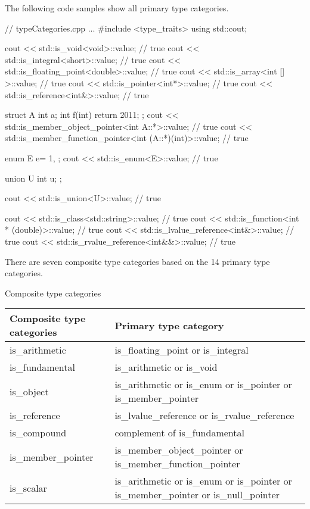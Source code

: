 The following code samples show all primary type categories.


\begin{cpp}
// typeCategories.cpp
...
#include <type_traits>
using std::cout;

cout << std::is_void<void>::value; // true
cout << std::is_integral<short>::value; // true
cout << std::is_floating_point<double>::value; // true
cout << std::is_array<int [] >::value; // true
cout << std::is_pointer<int*>::value; // true
cout << std::is_reference<int&>::value; // true

struct A{
	int a;
	int f(int){ return 2011; }
};
cout << std::is_member_object_pointer<int A::*>::value; // true
cout << std::is_member_function_pointer<int (A::*)(int)>::value; // true

enum E{
	e= 1,
};
cout << std::is_enum<E>::value; // true

union U{
	int u;
};

cout << std::is_union<U>::value; // true

cout << std::is_class<std::string>::value; // true
cout << std::is_function<int * (double)>::value; // true
cout << std::is_lvalue_reference<int&>::value; // true
cout << std::is_rvalue_reference<int&&>::value; // true
\end{cpp}


There are seven composite type categories based on the 14 primary type categories.

\begin{center}
Composite type categories
\end{center}

\begin{longtable}[c]{|l|l|}
\hline
\textbf{Composite type categories} & \textbf{Primary type category}                 \\ \hline
\endfirsthead
%
\endhead
%
is\_arithmetic                     & is\_floating\_point or is\_integral            \\ \hline
is\_fundamental                    & is\_arithmetic or is\_void                     \\ \hline
is\_object          & is\_arithmetic or is\_enum or is\_pointer or is\_member\_pointer                      \\ \hline
is\_reference                      & is\_lvalue\_reference or is\_rvalue\_reference \\ \hline
is\_compound                       & complement of is\_fundamental                  \\ \hline
is\_member\_pointer & is\_member\_object\_pointer or is\_member\_function\_pointer                          \\ \hline
is\_scalar          & is\_arithmetic or is\_enum or is\_pointer or is\_member\_pointer or is\_null\_pointer \\ \hline
\end{longtable}


